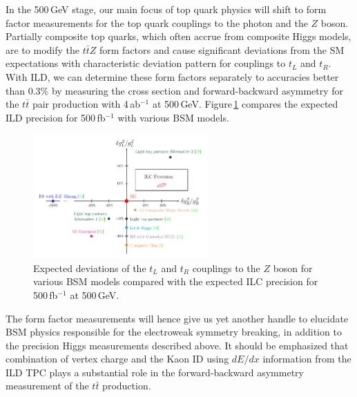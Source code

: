 In the 500\,GeV stage, our main focus of top quark physics will shift to form factor measurements for the top quark couplings to the photon and the $Z$ boson. Partially composite top quarks, which often accrue from composite Higgs models, are to modify the $t\bar{t}Z$ form factors and cause significant deviations from the SM expectations with characteristic deviation pattern for couplings to $t_L$ and $t_R$. With ILD, we can determine these form factors separately to accuracies better than 0.3\%
by measuring the cross section and forward-backward asymmetry for the $t\bar{t}$ pair production with 4\,ab$^{-1}$ at 500\,GeV\cite{Amjad:2015mma}. 
Figure\,\ref{fig:ttZ_gLgR} compares the expected ILD precision for 500\,fb$^{-1}$ with various BSM models.
\begin{figure}[htbp]
\begin{center}
 \includegraphics[width=0.6\textwidth]{Science/fig/ttZ_gLgR}
\end{center}
\caption{Expected deviations of the $t_L$ and $t_R$ couplings to the $Z$ boson for various BSM models compared with the expected ILC precision for 500\,fb$^{-1}$ at 500\,GeV\cite{Ref:FttZ}.
}
\label{fig:ttZ_gLgR}
\end{figure}
The form factor measurements will hence give us yet another handle to elucidate BSM physics responsible for the electroweak symmetry breaking, in addition to the precision Higgs measurements described above. It should be emphasized that combination of vertex charge and the Kaon ID using $dE/dx$ information from the ILD TPC plays a substantial role in the forward-backward asymmetry measurement of the $t\bar{t}$ production.
\\

%



